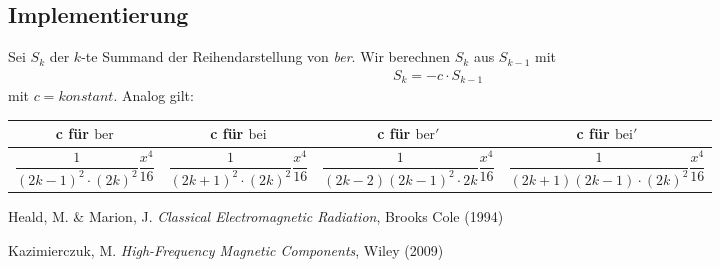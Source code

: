 \documentclass[10pt,a4paper]{article}
\begin{document}
\subsection{Implementierung}

Sei $S_k$ der $k$-te Summand der Reihendarstellung von \emph{ber}. Wir berechnen $S_k$ aus $S_{k-1}$ mit
\begin{align}
	S_k=-c\cdot S_{k-1}
\end{align} mit $c=konstant$.
Analog gilt:\newline
\begin{tabular}{c|c|c|c}
\centering
\rule[1ex]{0pt}{2.5ex} c für $\mathrm{ber}$ & c für $\mathrm{bei}$ & c für $\mathrm{ber}'$ & c für $\mathrm{bei}'$ \\ 
\hline 
\rule[2ex]{0pt}{2.5ex} $\dfrac{1}{(2k-1)^2\cdot(2k)^2}\dfrac{x^4}{16}$ & $\dfrac{1}{(2k+1)^2\cdot(2k)^2}\dfrac{x^4}{16}$ & $\dfrac{1}{(2k-2)(2k-1)^2\cdot 2k}\dfrac{x^4}{16}$ & $\dfrac{1}{(2k+1)(2k-1) \cdot (2k)^2}\dfrac{x^4}{16}$ \\ 
\end{tabular}
\begin{thebibliography}{9}

Heald, M. \& Marion, J. \emph{Classical Electromagnetic Radiation},
Brooks Cole (1994)

Kazimierczuk, M.
\emph{High-Frequency Magnetic Components},
Wiley (2009)

\end{thebibliography}
\end{document}
